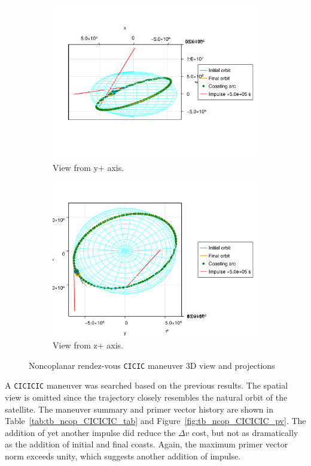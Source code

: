 \begin{figure}[htbp]
\begin{subfigure}{0.49\linewidth}
        \includegraphics[width=\linewidth]{../results/two_body/ipv_noncop/CICIC_y+.png}
        \caption{View from y+ axis.}
    \end{subfigure}
    \begin{subfigure}{0.49\linewidth}
        \includegraphics[width=\linewidth]{../results/two_body/ipv_noncop/CICIC_z+.png}
        \caption{View from z+ axis.}
    \end{subfigure}
    \caption{Noncoplanar rendez-vous \texttt{CICIC} maneuver 3D view and projections}
    \label{fig:tb_ncop_CICIC_figs}
\end{figure}

A \texttt{CICICIC} maneuver was searched based on the previous results. The spatial view is omitted since the trajectory closely resembles the natural orbit of the satellite. The maneuver summary and primer vector history are shown in Table~\ref{tab:tb_ncop_CICICIC_tab} and Figure~\ref{fig:tb_ncop_CICICIC_pv}. The addition of yet another impulse did reduce the \(\Delta v\) cost, but not as dramatically as the addition of initial and final coasts. Again, the maximum primer vector norm exceeds unity, which suggests another addition of impulse.

